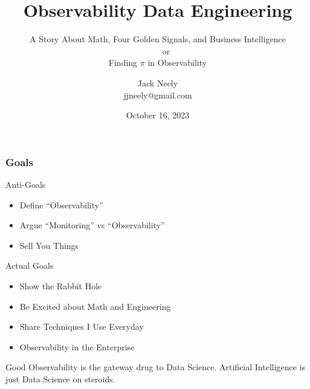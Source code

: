 

\title{Observability Data Engineering}
\subtitle{A Story About Math, Four Golden Signals, and Business Intelligence\\
~~~~or\\
Finding $\pi$ in Observability}
\author{Jack Neely\\ jjneely@gmail.com}

\date{October 16, 2023}

\newcommand{\hcancel}[1]{%
    \tikz[baseline=(tocancel.base)]{%
        \node[inner sep=0pt,outer sep=0pt] (tocancel) {#1};
        \draw[red, very thick] (tocancel.south west) -- (tocancel.north east);
    }%
}%
\newcommand{\icancel}[1]{%
    \tikz[baseline=(tocancel.base)]{%
        \node[inner sep=0pt,outer sep=0pt] (tocancel) {#1};
        \draw[red, very thick] (tocancel.south west) -- (tocancel.north east);
        \draw[red, very thick] (tocancel.south east) -- (tocancel.north west);
    }%
}%

\usepackage[most]{tcolorbox}



\maketitle

\begin{frame}
    \frametitle{Goals}

Anti-Goals
    \begin{itemize}
        \item Define ``Observability''
        \item Argue ``Monitoring'' vs ``Observability''
        \item Sell You Things
    \end{itemize}

Actual Goals
    \begin{itemize}
        \item Show the Rabbit Hole
        \item Be Excited about Math and Engineering
        \item Share Techniques I Use Everyday
        \item Observability in the Enterprise
    \end{itemize}

    Good Observability is the gateway drug to Data Science.  Artificial
    Intelligence is just Data Science on steroids.
\end{frame}

